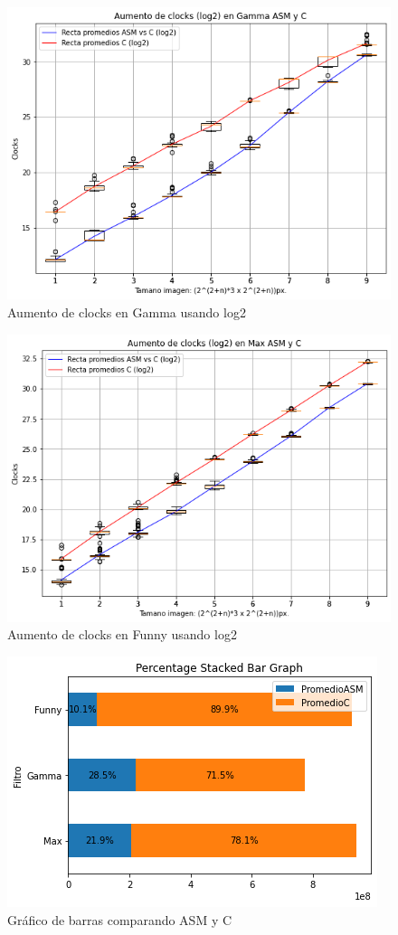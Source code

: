 \documentclass[a4paper]{article}
\begin{document}
\begin{figure}[htp]
    \centering
    \includegraphics[scale=.5]{log22.jpg}
    \caption{Aumento de clocks en Gamma usando log2} 
    \label{fig:galaxy}
\end{figure}

\begin{figure}[htp]
    \centering
    \includegraphics[scale=.5]{log21.jpg}
    \caption{Aumento de clocks en Funny usando log2}
    \label{fig:galaxy}
\end{figure}
\begin{figure}[htp]
    \centering
    \includegraphics[scale=.5]{barras.jpg}
    \caption{Gráfico de barras comparando ASM y C}
    \label{fig:galaxy}
\end{figure}
\end{document}
